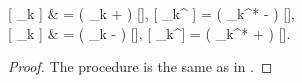 \begin{theorem}
\label{thm:wigner:mm:correspondences}
	\begin{eqn*}
		 [ _k  ]
			& = \left( \alpha_k +   \right)
				[],
		\quad
		 [ _k^\dagger {} ]
			= \left( \alpha_k^* -   \right)
				[], \\
		 [  _k ]
			& = \left( \alpha_k -   \right)
				[],
		\quad
		 [  _k^\dagger ]
			= \left( \alpha_k^* +   \right)
				[].
	\end{eqn*}
\end{theorem}
\begin{proof}
The procedure is the same as in .
\end{proof}

